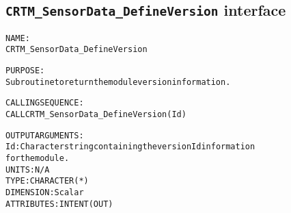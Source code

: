 \subsection{\texttt{CRTM\_SensorData\_DefineVersion} interface}
  \label{sec:CRTM_SensorData_DefineVersion_interface}
  \begin{alltt}
 
  NAME:
        CRTM_SensorData_DefineVersion
 
  PURPOSE:
        Subroutine to return the module version information.
 
  CALLING SEQUENCE:
        CALL CRTM_SensorData_DefineVersion( Id )
 
  OUTPUT ARGUMENTS:
        Id:            Character string containing the version Id information
                       for the module.
                       UNITS:      N/A
                       TYPE:       CHARACTER(*)
                       DIMENSION:  Scalar
                       ATTRIBUTES: INTENT(OUT)
 
  \end{alltt}
